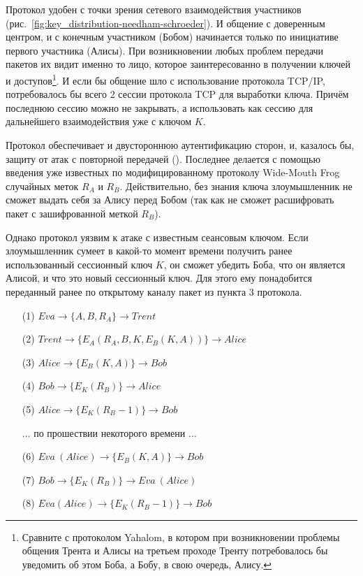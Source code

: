 Протокол удобен с точки зрения сетевого взаимодействия участников (рис.~\ref{fig:key_distribution-needham-schroeder}). И общение с доверенным центром, и с конечным участником (Бобом) начинается только по инициативе первого участника (Алисы). При возникновении любых проблем передачи пакетов их видит именно то лицо, которое заинтересованно в получении ключей и доступов\footnote{Сравните с протоколом Yahalom, в котором при возникновении проблемы общения Трента и Алисы на третьем проходе Тренту потребовалось бы уведомить об этом Боба, а Бобу, в свою очередь, Алису.}. И если бы общение шло с использование протокола TCP/IP, потребовалось бы всего 2 сессии протокола TCP для выработки ключа. Причём последнюю сессию можно не закрывать, а использовать как сессию для дальнейшего взаимодействия уже с ключом $K$.

Протокол обеспечивает и двустороннюю аутентификацию сторон, и, казалось бы, защиту от атак с повторной передачей (). Последнее делается с помощью введения уже известных по модифицированному протоколу Wide-Mouth Frog случайных меток $R_A$ и $R_B$. Действительно, без знания ключа злоумышленник не сможет выдать себя за Алису перед Бобом (так как не сможет расшифровать пакет с зашифрованной меткой $R_B$).

Однако протокол уязвим к атаке с известным сеансовым ключом. Если злоумышленник сумеет в какой-то момент времени получить ранее использованный сессионный ключ $K$, он сможет убедить Боба, что он является Алисой, и что это новый сессионный ключ. Для этого ему понадобится переданный ранее по открытому каналу пакет из пункта 3 протокола.

\begin{itemize}
	\item[(1)] $ Eva \to \{ A, B, R_A \} \to Trent $
	\item[(2)] $ Trent \to \{ E_A \left( R_A, B, K, E_B \left( K, A \right) \right) \}	\to Alice $
	\item[(3)] $ Alice \to \{ E_B \left( K, A \right) \} \to Bob $
	\item[(4)] $ Bob \to \{ E_K \left( R_B \right) \} \to Alice $
	\item[(5)] $ Alice \to \{ E_K \left( R_B - 1 \right) \} \to Bob $
	\item[{}]  $\dots$ по прошествии некоторого времени $\dots$
	\item[(6)] $ Eva~(Alice) \to \{ E_B \left( K, A \right) \} \to Bob $
	\item[(7)] $ Bob \to \{ E_K \left( R_B \right) \} \to Eva~(Alice) $
	\item[(8)] $ Eva (Alice) \to \{ E_K \left( R_B - 1 \right) \} \to Bob $
\end{itemize}

